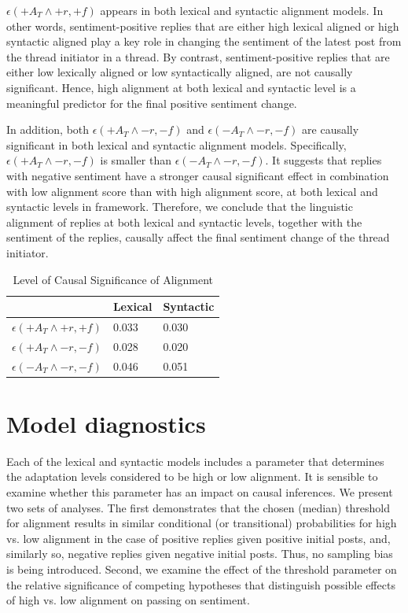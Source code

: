 $\epsilon(+A_T \wedge +r, +f)$ appears in both lexical and syntactic alignment models. In other words, sentiment-positive replies that are either high lexical aligned or high syntactic aligned play a key role in changing the sentiment of the latest post from the thread initiator in a thread. By contrast, sentiment-positive replies that are either low lexically aligned or low syntactically aligned, are not causally significant. Hence, high alignment at both lexical and syntactic level is a meaningful predictor for the final positive sentiment change.

In addition, both $\epsilon(+A_{T} \wedge -r, -f)$ and $\epsilon(-A_{T} \wedge -r, -f)$ are causally significant in both lexical and syntactic alignment models. Specifically, $\epsilon(+A_{T}\wedge -r, -f)$ is smaller than $\epsilon(-A_{T} \wedge -r, -f)$. It suggests that replies with negative sentiment have a stronger causal significant effect in combination with low alignment score than with high alignment score, at both lexical and syntactic levels in    framework. Therefore, we conclude that the linguistic alignment of replies at both lexical and syntactic levels, together with the sentiment of the replies, causally affect the final sentiment change of the thread initiator.


\begin{table}[]
\centering
\begin{tabular}{l|l|l}
                             & Lexical & Syntactic \\ \hline
$\epsilon(+A_{T} \wedge +r, +f)$ & 0.033   & 0.030     \\ \hline
$\epsilon(+A_{T} \wedge -r, -f)$ & 0.028   & 0.020     \\ \hline
$\epsilon(-A_{T} \wedge -r, -f)$ & 0.046   & 0.051     \\ \hline
\end{tabular}
\caption{Level of Causal Significance of Alignment}
\label{tab:CausalSig}
\end{table}


\section{Model diagnostics}

Each of the lexical and syntactic models includes a parameter that determines the adaptation levels considered to be high or low alignment.  It is sensible to examine whether this parameter has an impact on causal inferences.  We present two sets of analyses.  The first demonstrates that the chosen (median) threshold for alignment results in similar conditional (or transitional) probabilities for high vs. low alignment in the case of positive replies given positive initial posts, and, similarly so, negative replies given negative initial posts.  Thus, no sampling bias is being introduced.  Second, we examine the effect of the threshold parameter on the relative significance of competing hypotheses that distinguish possible effects of high vs. low alignment on passing on sentiment.


